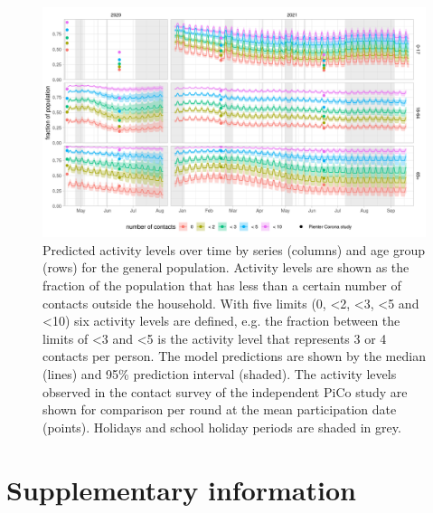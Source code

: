 \documentclass[fleqn,10pt]{wlscirep}
\begin{document}
\begin{figure}[ht]
\centering
\includegraphics[width=\linewidth]{../figures/prediction_generalpopulation_cat6.png}
\caption{Predicted activity levels over time by series (columns) and age group (rows) for the general population. Activity levels are shown as the fraction of the population that has less than a certain number of contacts outside the household. With five limits (0, <2, <3, <5 and <10) six activity levels are defined, e.g. the fraction between the limits of <3 and <5 is the activity level that represents 3 or 4 contacts per person. The model predictions are shown by the median (lines) and 95\% prediction interval (shaded). The activity levels observed in the contact survey of the independent PiCo study are shown for comparison per round at the mean participation date (points). Holidays and school holiday periods are shaded in grey.}
\label{fig:genpop}
\end{figure}

\clearpage



\section*{Supplementary information}


\renewcommand{\thefigure}{S\arabic{figure}}
\setcounter{figure}{0}
\renewcommand{\thetable}{S\arabic{table}}
\setcounter{table}{0}
\end{document}
